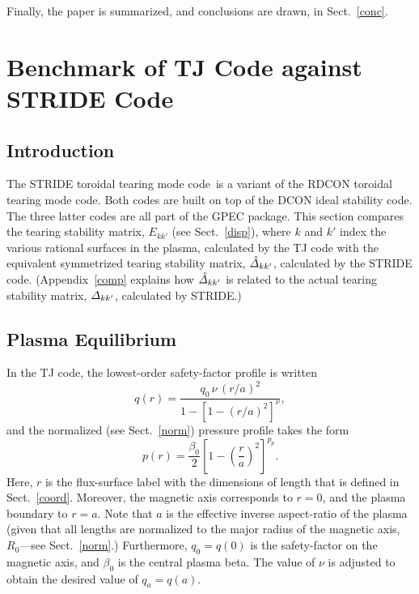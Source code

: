 \documentclass[12pt,prb,aps]{revtex4-1}
\begin{document}
Finally, the paper is summarized, and conclusions are drawn, in Sect.~\ref{conc}. 

\section{Benchmark of TJ Code against STRIDE Code}\label{benchmark}
\subsection{Introduction}
The STRIDE toroidal tearing mode code\,\cite{aglas1} is a variant of the RDCON toroidal tearing mode code.\cite{aglas2} Both codes are built on top of the
DCON ideal stability code.\cite{dcon} The three latter codes are all  part of the GPEC package.\cite{gpec} This section compares the tearing stability matrix, $E_{kk'}$ (see Sect.~\ref{disp}), where $k$ and $k'$ index the various rational surfaces in the
plasma, calculated by the TJ code with the equivalent symmetrized tearing stability matrix, $\hat{\mit\Delta}_{kk'}$, calculated by the STRIDE code. (Appendix~\ref{comp} explains how
$\hat{\mit\Delta}_{kk'}$ is related to the actual tearing stability matrix, ${\mit\Delta}_{kk'}$, calculated by STRIDE.)

\subsection{Plasma Equilibrium}
In the TJ code, the lowest-order safety-factor profile is written\,\cite{tj}
\begin{equation}
q(r) = \frac{q_0\,\nu\,(r/a)^2}{1-[1-(r/a)^2]^\nu},
\end{equation}
and the normalized (see Sect.~\ref{norm}) pressure profile takes the form
\begin{equation}
p(r) = \frac{\beta_0}{2}\left[1-\left(\frac{r}{a}\right)^2\right]^{p_p}.
\end{equation}
Here, $r$ is the flux-surface label with the dimensions of length that is defined in Sect.~\ref{coord}.  Moreover, the magnetic axis corresponds to $r=0$, and the plasma
boundary to $r=a$.  Note that $a$ is the effective inverse aspect-ratio of the plasma (given that all lengths are normalized to the major radius of the magnetic axis, $R_0$---see Sect.~\ref{norm}.)
Furthermore, $q_0=q(0)$ is the safety-factor on the magnetic axis, and  $\beta_0$ is the central plasma beta. 
The value of $\nu$ is adjusted to obtain the desired value of $q_a=q(a)$. 
\end{document}
